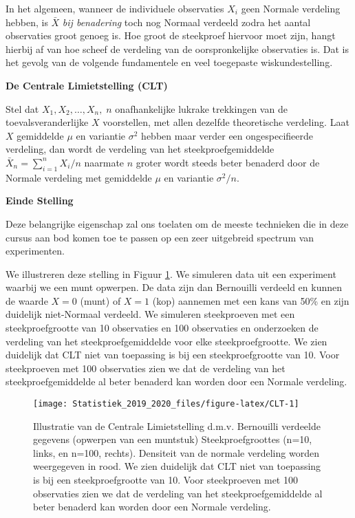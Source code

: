 \documentclass[12pt,dutch,coursenotes]{book}
\theoremstyle{definition}
\theoremstyle{definition}
\theoremstyle{definition}
\theoremstyle{remark}
\begin{document}
In het algemeen, wanneer de individuele observaties \(X_i\) geen Normale
verdeling hebben, is \(\bar X\) \textit{bij benadering} toch nog Normaal
verdeeld zodra het aantal observaties groot genoeg is. Hoe groot de
steekproef hiervoor moet zijn, hangt hierbij af van hoe scheef de
verdeling van de oorspronkelijke observaties is. Dat is het gevolg van
de volgende fundamentele en veel toegepaste wiskundestelling.

\textbf{De Centrale Limietstelling (CLT)}

Stel dat \(X_1, X_2, \dots, X_n, \; n\) onafhankelijke lukrake
trekkingen van de toevalsveranderlijke \(X\) voorstellen, met allen
dezelfde theoretische verdeling. Laat \(X\) gemiddelde \(\mu\) en
variantie \(\sigma^2\) hebben maar verder een ongespecifieerde
verdeling, dan wordt de verdeling van het steekproefgemiddelde
\(\bar{X}_n = {\sum_{i=1}^{n} X_i}/{n}\) naarmate \(n\) groter wordt
steeds beter benaderd door de Normale verdeling met gemiddelde \(\mu\)
en variantie \(\sigma^2/n.\)

\textbf{Einde Stelling}

Deze belangrijke eigenschap zal ons toelaten om de meeste technieken die
in deze cursus aan bod komen toe te passen op een zeer uitgebreid
spectrum van experimenten.

We illustreren deze stelling in Figuur \ref{fig:CLT}. We simuleren data
uit een experiment waarbij we een munt opwerpen. De data zijn dan
Bernouilli verdeeld en kunnen de waarde \(X=0\) (munt) of \(X=1\) (kop)
aannemen met een kans van 50\% en zijn duidelijk niet-Normaal verdeeld.
We simuleren steekproeven met een steekproefgrootte van 10 observaties
en 100 observaties en onderzoeken de verdeling van het
steekproefgemiddelde voor elke steekproefgrootte. We zien duidelijk dat
CLT niet van toepassing is bij een steekproefgrootte van 10. Voor
steekproeven met 100 observaties zien we dat de verdeling van het
steekproefgemiddelde al beter benaderd kan worden door een Normale
verdeling.

\begin{figure}

{\centering \texttt{[image: Statistiek\_2019\_2020\_files/figure-latex/CLT-1]} 

}

\caption{Illustratie van de Centrale Limietstelling d.m.v. Bernouilli verdeelde gegevens (opwerpen van een muntstuk) Steekproefgroottes (n=10, links, en n=100, rechts). Densiteit van de normale verdeling worden weergegeven in rood. We zien duidelijk dat CLT niet van toepassing is bij een steekproefgrootte van 10. Voor steekproeven met 100 observaties zien we dat de verdeling van het steekproefgemiddelde al beter benaderd kan worden door een Normale verdeling.}\label{fig:CLT}
\end{figure}
\end{document}
